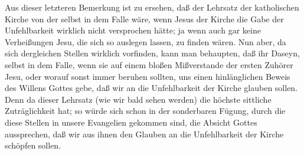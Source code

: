 \begin{aufza}
\begin{RWanm} Aus dieser letzteren Bemerkung ist zu ersehen, daß der Lehrsatz der katholischen Kirche von der  selbst in dem Falle  wäre, wenn Jesus der Kirche die Gabe der Unfehlbarkeit wirklich nicht versprochen hätte; ja wenn auch gar keine Verheißungen Jesu, die sich so auslegen lassen, zu finden wären. Nun aber, da sich dergleichen Stellen wirklich vorfinden, kann man behaupten, daß ihr Daseyn, selbst in dem Falle, wenn sie auf einem bloßen Mißverstande der ersten Zuhörer Jesu, oder worauf sonst immer beruhen sollten, uns einen hinlänglichen Beweis des Willens Gottes gebe, daß wir an die Unfehlbarkeit der Kirche glauben sollen. Denn da dieser Lehrsatz (wie wir bald sehen werden) die höchste sittliche Zuträglichkeit hat; so würde sich schon in der sonderbaren Fügung, durch die diese Stellen in unsere Evangelien gekommen sind, die Absicht Gottes aussprechen, daß wir aus ihnen den Glauben an die Unfehlbarkeit der Kirche schöpfen sollen.\end{RWanm}
\end{aufza}


